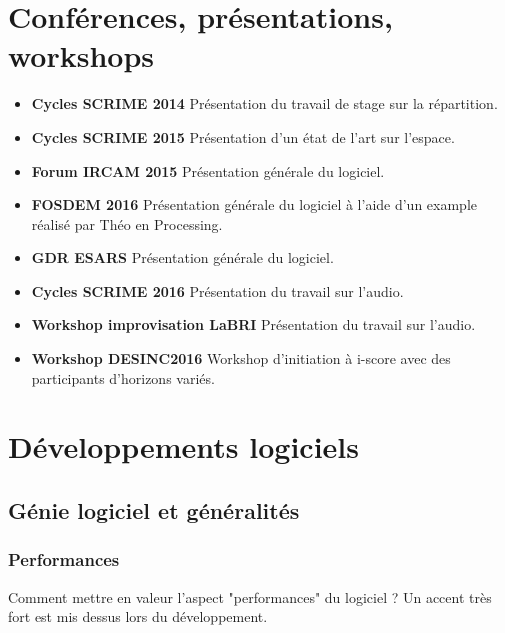 \documentclass[french,a4paper,openany,12pt]{book}
\begin{document}
\section{Conférences, présentations, workshops}
\begin{itemize}
    \item \textbf{Cycles SCRIME 2014}
    Présentation du travail de stage sur la répartition.
    \item \textbf{Cycles SCRIME 2015}
    Présentation d'un état de l'art sur l'espace.
    \item \textbf{Forum IRCAM 2015}
    Présentation générale du logiciel.
    \item \textbf{FOSDEM 2016}
    Présentation générale du logiciel à l'aide d'un example réalisé par Théo en Processing.
    \item \textbf{GDR ESARS}
    Présentation générale du logiciel.
    \item \textbf{Cycles SCRIME 2016}
    Présentation du travail sur l'audio.
    \item \textbf{Workshop improvisation LaBRI}
    Présentation du travail sur l'audio.
    \item \textbf{Workshop DESINC2016}
    Workshop d'initiation à i-score avec des participants d'horizons variés.
\end{itemize}
\section{Développements logiciels}

\subsection{Génie logiciel et généralités}
\subsubsection{Performances}
Comment mettre en valeur l'aspect "performances" du logiciel ? 
Un accent très fort est mis dessus lors du développement.
\end{document}
